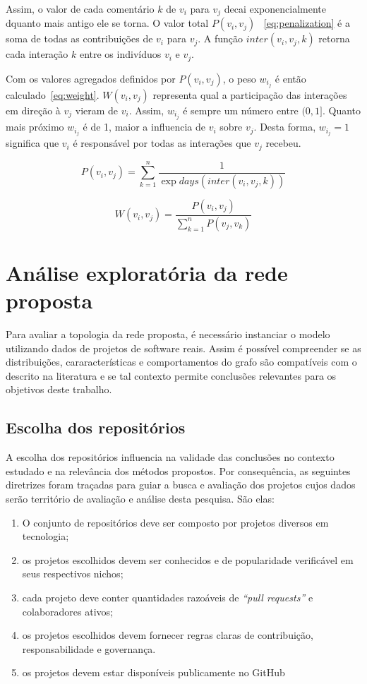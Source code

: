 \documentclass[12pt,openany,oneside,a4paper,english,brazil]{abntbibufjf}
\begin{document}
 Assim, o valor de cada comentário $k$ de $v_i$ para $v_j$ decai exponencialmente dquanto mais antigo ele se torna. O valor total $P(v_i,v_j)$ ~\eqref{eq:penalization} é a soma de todas as contribuições de  $v_i$ para $v_j$. A função $inter(v_i,v_j, k)$ retorna cada interação $k$ entre os indivíduos $v_i$ e $v_j$.

Com os valores agregados definidos por $P(v_i,v_j)$, o peso $w_i_j$ é então calculado~\eqref{eq:weight}. $W(v_i,v_j)$ representa qual a participação das interações em direção à $v_j$ vieram de $v_i$. Assim, $w_i_j$ é sempre um número entre $(0,1]$. Quanto mais próximo $w_i_j$ é de 1, maior a influencia de $v_i$ sobre $v_j$. Desta forma, $w_i_j = 1$ significa que $v_i$ é responsável por todas as interações que $v_j$ recebeu.


\begin{equation}
P(v_i,v_j)=\sum\limits_{k=1}^{n}\frac{1}{\exp{days(inter(v_i,v_j, k))}}\label{eq:penalization}
\end{equation}

\begin{equation}
W(v_i,v_j)=\frac{P(v_i,v_j)}{\sum\limits_{k=1}^{n}{P(v_j,v_k)}}\label{eq:weight}
\end{equation}


\section{Análise exploratória da rede proposta}
  Para avaliar a topologia da rede proposta, é necessário instanciar o modelo utilizando dados de projetos de software reais. Assim é possível compreender se as distribuições, cararacterísticas e comportamentos do grafo são compatíveis com o descrito na literatura e se tal contexto permite conclusões relevantes para os objetivos deste trabalho.
  \subsection{Escolha dos repositórios}\label{subsec:escolhaprojetos}
  A escolha dos repositórios influencia na validade das conclusões no contexto estudado e na relevância dos métodos propostos. Por consequência, as seguintes diretrizes foram traçadas para guiar a busca e avaliação dos projetos cujos dados serão território de avaliação e análise desta pesquisa. São elas:

  \begin{enumerate}
    \item O conjunto de repositórios deve ser composto por projetos diversos em tecnologia;
    \item os projetos escolhidos devem ser conhecidos e de popularidade verificável em seus respectivos nichos;
    \item cada projeto deve conter quantidades razoáveis de \textit{``pull requests''} e colaboradores ativos;
    \item os projetos escolhidos devem fornecer regras claras de contribuição, responsabilidade e governança.
    \item os projetos devem estar disponíveis publicamente no GitHub
  \end{enumerate}
\end{document}
